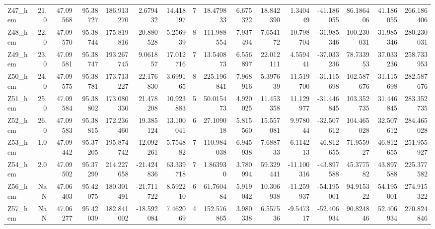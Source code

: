 \documentclass[11pt]{article}
\begin{document}
\begin{sidewaystable}
{\begin{tabular}{lrrrrrrrrrrrrrrr}
Z47\_hem &       21.0 &  47.09568 &  95.38727 &  186.913270 &   2.679432 &  14.418197 &  7 &   18.479833 &  6.675322 &  18.842390 &       1.340449 & -41.186055 &   86.186406 &    41.186055 &   266.186406 \\
Z48\_hem &       22.0 &  47.09570 &  95.38744 &  175.819816 &  20.880528 &   5.256939 &  8 &  111.988554 &  7.937494 &   7.654172 &      10.798704 & -31.985346 &  100.230031 &    31.985346 &   280.230031 \\
Z49\_hem &       23.0 &  47.09581 &  95.38747 &  193.267745 &   9.061857 &  17.012716 &  7 &   13.540873 &  6.556897 &  22.012111 &       4.559441 & -37.033236 &   78.733953 &    37.033236 &   258.733953 \\
Z50\_hem &       24.0 &  47.09575 &  95.38781 &  173.713227 &  22.176830 &   3.699165 &  8 &  225.196841 &  7.968916 &   5.397639 &      11.519700 & -31.115698 &  102.587676 &    31.115698 &   282.587676 \\
Z51\_hem &       25.0 &  47.09584 &  95.38802 &  173.080330 &  21.478208 &  10.923883 &  5 &   50.015473 &  4.920025 &  11.453358 &      11.129977 & -31.446845 &  103.352735 &    31.446845 &   283.352735 \\
Z52\_hem &       26.0 &  47.09583 &  95.38815 &  172.236460 &  19.385124 &  13.100041 &  6 &   27.109018 &  5.815560 &  15.557081 &       9.978044 & -32.507612 &  104.465028 &    32.507612 &   284.465028 \\
Z53\_hem &        1.0 &  47.09442 &  95.37205 &  195.874742 & -12.092261 &   5.754882 &  7 &  110.984038 &  6.945938 &   7.688733 &      -6.114213 & -46.812655 &   71.955927 &    46.812655 &   251.955927 \\
Z54\_hem &        2.0 &  47.09502 &  95.37299 &  214.227658 & -21.424836 &  63.339718 &  7 &    1.863930 &  3.780994 &  59.329441 &     -11.100316 & -43.897588 &   45.377582 &    43.897588 &   225.377582 \\
Z56\_hem &        NaN &  47.06403 &  95.42075 &  180.301491 & -21.711722 &   8.592210 &  6 &   61.760484 &  5.919042 &  10.306938 &     -11.259937 & -54.195001 &   94.915322 &    54.195001 &   274.915322 \\
Z57\_hem &        NaN &  47.06277 &  95.42039 &  182.841002 & -18.592084 &   7.462069 &  4 &  152.576865 &  3.980338 &   6.557536 &      -9.547317 & -52.406934 &   90.824846 &    52.406934 &   270.824846 \\
\bottomrule
\end{tabular}}
\end{sidewaystable}
    
\end{document}
